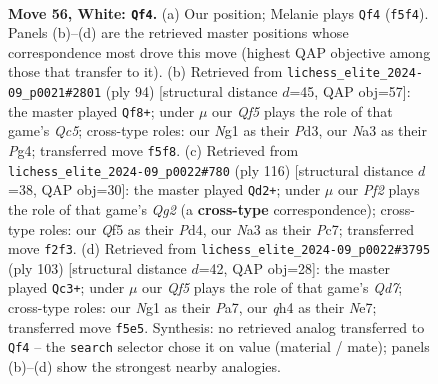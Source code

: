 \documentclass[11pt]{article}
\begin{document}
\clearpage

\begin{figure}[p]\centering
\begin{subfigure}{0.46\textwidth}\centering
\resizebox{\linewidth}{!}{%
\newchessgame
\chessboard[
  setfen={4n2k/8/p3P3/3P1Q1p/b5pq/N7/5P2/5KN1 w - - 1 56},
  showmover=false,
  pgfstyle=straightmove, color=movearrow, markmove={f5-f4}
]}
\caption{}
\end{subfigure}\hfill
\begin{subfigure}{0.46\textwidth}\centering
\resizebox{\linewidth}{!}{%
\newchessgame
\chessboard[
  setfen={7k/8/4p3/p1Q1P3/qp4P1/3P4/4KP2/8 w - - 0 48},
  showmover=false,
  pgfstyle=straightmove, color=movearrow, markmove={c5-f8}
]}
\caption{}
\end{subfigure}
\\[4pt]
\begin{subfigure}{0.46\textwidth}\centering
\resizebox{\linewidth}{!}{%
\newchessgame
\chessboard[
  setfen={2b3Q1/2P5/5p1k/2N1pq2/3P4/6P1/6QK/8 w - - 6 59},
  showmover=false,
  pgfstyle=straightmove, color=movearrow, markmove={g2-d2}
]}
\caption{}
\end{subfigure}\hfill
\begin{subfigure}{0.46\textwidth}\centering
\resizebox{\linewidth}{!}{%
\newchessgame
\chessboard[
  setfen={8/p3npk1/7p/1p2PP2/2pNQ3/7K/P2q4/8 b - - 4 52},
  showmover=false,
  pgfstyle=straightmove, color=movearrow, markmove={d2-c3}
]}
\caption{}
\end{subfigure}
\caption{\textbf{Move 56, White: \texttt{Qf4}.} (a) Our position; Melanie plays \texttt{Qf4} (\texttt{f5f4}). Panels (b)--(d) are the retrieved master positions whose correspondence most drove this move (highest QAP objective among those that transfer to it). (b) Retrieved from \texttt{lichess\_elite\_2024-09\_p0021\#2801} (ply 94) [structural distance $d$=45, QAP obj=57]: the master played \texttt{Qf8+}; under $\mu$ our \emph{Qf5} plays the role of that game's \emph{Qc5}; cross-type roles: our \emph{N}g1 as their \emph{P}d3, our \emph{N}a3 as their \emph{P}g4; transferred move \texttt{f5f8}. (c) Retrieved from \texttt{lichess\_elite\_2024-09\_p0022\#780} (ply 116) [structural distance $d$=38, QAP obj=30]: the master played \texttt{Qd2+}; under $\mu$ our \emph{Pf2} plays the role of that game's \emph{Qg2} (a \textbf{cross-type} correspondence); cross-type roles: our \emph{Q}f5 as their \emph{P}d4, our \emph{N}a3 as their \emph{P}c7; transferred move \texttt{f2f3}. (d) Retrieved from \texttt{lichess\_elite\_2024-09\_p0022\#3795} (ply 103) [structural distance $d$=42, QAP obj=28]: the master played \texttt{Qc3+}; under $\mu$ our \emph{Qf5} plays the role of that game's \emph{Qd7}; cross-type roles: our \emph{N}g1 as their \emph{P}a7, our \emph{q}h4 as their \emph{N}e7; transferred move \texttt{f5e5}. Synthesis: no retrieved analog transferred to \texttt{Qf4} -- the \texttt{search} selector chose it on value (material / mate); panels (b)--(d) show the strongest nearby analogies.}
\label{fig:thought-m110}
\end{figure}
\end{document}
